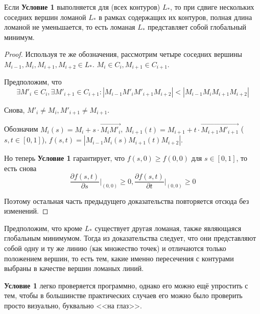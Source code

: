 \documentclass[10pt]{SPIIRAS_Proceedings}
\begin{document}
\begin{proposition}
Если
\textbf{Условие 1}
выполняется для
(всех контуров)
$L_*$,
то
при сдвиге нескольких соседних вершин ломаной
$L_*$
в рамках содержащих их контуров,
полная длина ломаной не уменьшается,
то есть ломаная
$L_*$
представляет собой глобальный минимум.
\end{proposition}

\begin{proof}
Используя те же обозначения,
рассмотрим четыре соседних вершины
$M_{i-1}, M_i, M_{i+1}, M_{i+2} \in L_*$.
$M_i \in  C_i,
M_{i+1} \in C_{i+1}$.

Предположим, что
$$
\exists M'_i \in C_i,
\exists M'_{i+1} \in C_{i+1}:
|M_{i-1} M'_i M'_{i+1} M_{i+2}|
<
|M_{i-1} M_i M_{i+1} M_{i+2}|
$$

Снова,
$
M'_i \ne M_i,
M'_{i+1} \ne M_{i+1}
$.

Обозначим
$
M_i(s)=M_i+s \cdot \overrightarrow{M_i M'_i}
$,
$
 M_{i+1}(t)= M_{i+1}+t \cdot \overrightarrow{M_{i+1} M'_{i+1}}
$
($s,t \in[0,1]$),
$f(s,t)=
|M_{i-1} M_i(s) M_{i+1}(t) M_{i+2}|
$.

Но теперь
{\bf Условие 1}
гарантирует, что
$f(s,0)\geqslant f(0,0)$
для
$s\in[0,1]$,
то есть снова
\begin{equation}
  \frac{\partial f(s,t)}{\partial s} \Big|_{(0,0)} \geqslant 0,
  \frac{\partial f(s,t)}{\partial t} \Big|_{(0,0)} \geqslant 0
\end{equation}

Поэтому остальная часть предыдущего доказательства
повторяется отсюда без изменений.
\end{proof}

Предположим,
что кроме
$L_*$
существует другая ломаная,
также являющаяся глобальным минимумом.
Тогда из доказательства следует,
что они представляют собой одну и ту же
линию
(как множество точек)
и отличаются только положением вершин,
то есть тем, какие именно пересечения
с контурами
выбраны в качестве вершин ломаных линий.

{\bf Условие 1}
легко проверяется программно,
однако его можно ещё упростить с тем,
чтобы в большинстве практических случаев
его можно было проверить просто визуально,
буквально <<на глаз>>.
\end{document}
